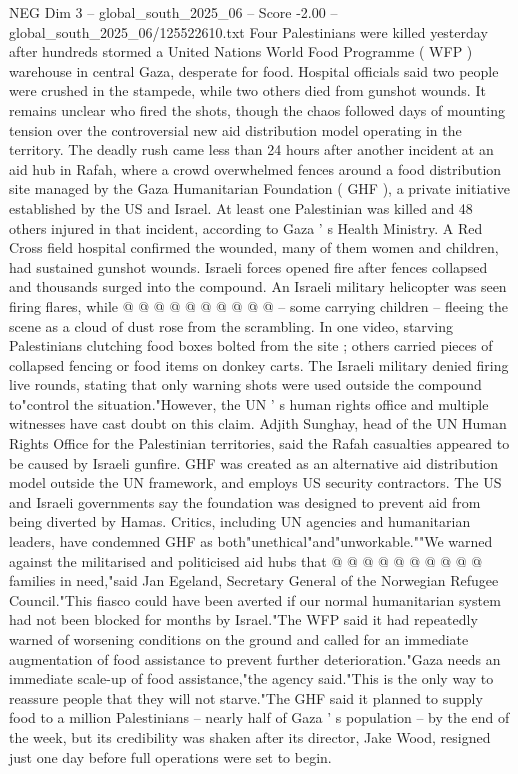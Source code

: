 \begin{textsample}{NEG Dim 3 – global\_south\_2025\_06 – Score -2.00 – global\_south\_2025\_06/125522610.txt}  \label{ex:f3_neg_262}
Four Palestinians were killed yesterday after hundreds stormed a United Nations World Food Programme ( WFP ) warehouse in central Gaza, desperate for food.
Hospital officials said two people were crushed in the stampede, while two others died from gunshot wounds.
It remains unclear who fired the shots, though the chaos followed days of mounting tension over the controversial new aid distribution model operating in the territory.
The deadly rush came less than 24 hours after another incident at an aid hub in Rafah, where a crowd overwhelmed fences around a food distribution site managed by the Gaza Humanitarian Foundation ( GHF ), a private initiative established by the US and Israel.
At least one Palestinian was killed and 48 others injured in that incident, according to Gaza ' s Health Ministry.
A Red Cross field hospital confirmed the wounded, many of them women and children, had sustained gunshot wounds.
Israeli forces opened fire after fences collapsed and thousands surged into the compound.
An Israeli military helicopter was seen firing flares, while @ @ @ @ @ @ @ @ @ @ -- some carrying children -- fleeing the scene as a cloud of dust rose from the scrambling.
In one video, starving Palestinians clutching food boxes bolted from the site ; others carried pieces of collapsed fencing or food items on donkey carts.
The Israeli military denied firing live rounds, stating that only warning shots were used outside the compound to"control the situation."However, the UN ' s human rights office and multiple witnesses have cast doubt on this claim.
Adjith Sunghay, head of the UN Human Rights Office for the Palestinian territories, said the Rafah casualties appeared to be caused by Israeli gunfire.
GHF was created as an alternative aid distribution model outside the UN framework, and employs US security contractors.
The US and Israeli governments say the foundation was designed to prevent aid from being diverted by Hamas.
Critics, including UN agencies and humanitarian leaders, have condemned GHF as both"unethical"and"unworkable.""We warned against the militarised and politicised aid hubs that @ @ @ @ @ @ @ @ @ @ families in need,"said Jan Egeland, Secretary General of the Norwegian Refugee Council."This fiasco could have been averted if our normal humanitarian system had not been blocked for months by Israel."The WFP said it had repeatedly warned of worsening conditions on the ground and called for an immediate augmentation of food assistance to prevent further deterioration."Gaza needs an immediate scale-up of food assistance,"the agency said."This is the only way to reassure people that they will not starve."The GHF said it planned to supply food to a million Palestinians -- nearly half of Gaza ' s population -- by the end of the week, but its credibility was shaken after its director, Jake Wood, resigned just one day before full operations were set to begin.

\end{textsample}

